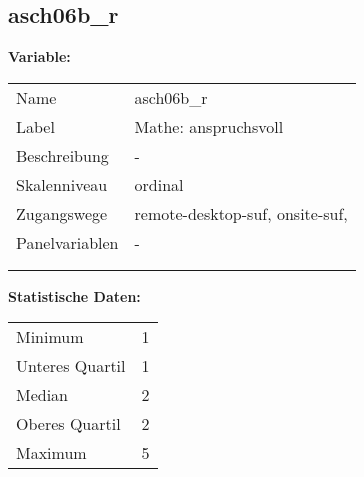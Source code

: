 	
	
	\subsection{asch06b\_r}
	\label{subSection:asch06b_r}

	\noindent\textbf{Variable:}\\
		\begin{tabular}{lL{11.3cm}}
			\label{tableVariable:asch06b_r}
			Name & asch06b\_r \\
			Label & Mathe: anspruchsvoll \\
			Beschreibung & - \\
			Skalenniveau & ordinal \\
			Zugangswege &
				remote-desktop-suf,
				onsite-suf,
 \\
			Panelvariablen & -
			 \\
			 \\
 \\
		\end{tabular}



		\vspace*{1 cm}
		\noindent\textbf{Statistische Daten:}\\
			\begin{tabular}{ll}
				\label{tableStatistics:asch06b_r}
					Minimum & 1 \\
					Unteres Quartil & 1 \\
					Median & 2 \\
					Oberes Quartil & 2 \\
					Maximum & 5 \\
			\end{tabular}



